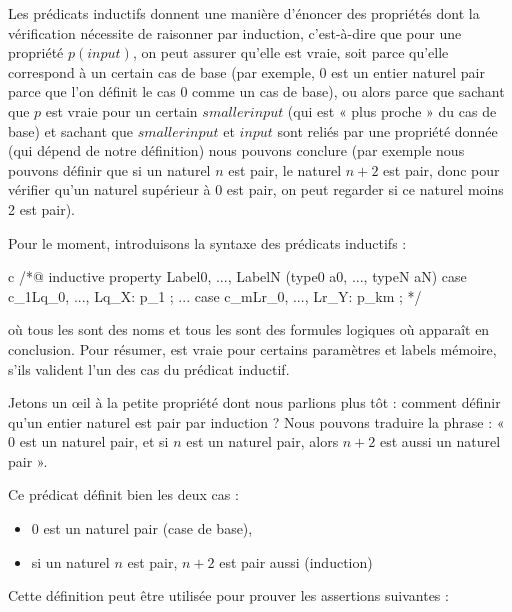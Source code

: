 Les prédicats inductifs donnent une manière d'énoncer des propriétés dont la
vérification nécessite de raisonner par induction, c'est-à-dire que pour une propriété
$p(input)$, on peut assurer qu'elle est vraie, soit parce qu'elle correspond à un
certain cas de base (par exemple, $0$ est un entier naturel pair parce que l'on
définit le cas 0 comme un cas de base), ou alors parce que sachant que $p$ est vraie
pour un certain $smaller input$ (qui est « plus proche » du cas de base) et sachant
que $smaller input$ et $input$ sont reliés par une propriété donnée (qui dépend
de notre définition) nous pouvons conclure (par exemple nous pouvons définir que
si un naturel $n$ est pair, le naturel $n+2$ est pair, donc pour vérifier qu'un
naturel supérieur à 0 est pair, on peut regarder si ce naturel moins 2 est pair).





Pour le moment, introduisons la syntaxe des prédicats inductifs :
\begin{CodeBlock}{c}
/*@
  inductive property{ Label0, ..., LabelN }(type0 a0, ..., typeN aN) {
  case c_1{Lq_0, ..., Lq_X}: p_1 ;
  ...
  case c_m{Lr_0, ..., Lr_Y}: p_km ;
  }
*/
\end{CodeBlock}
où tous les  sont des noms et tous les  sont
des formules logiques où  apparaît en conclusion. Pour résumer,
 est vraie pour certains paramètres et labels mémoire, s'ils
valident l'un des cas du prédicat inductif.


Jetons un \oe{}il à la petite propriété dont nous parlions plus tôt : comment définir
qu'un entier naturel est pair par induction ? Nous pouvons traduire la phrase :
« 0 est un naturel pair, et si $n$ est un naturel pair, alors $n+2$ est aussi un
naturel pair ».




Ce prédicat définit bien les deux cas :


\begin{itemize}
\item $0$ est un naturel pair (case de base),
\item si un naturel $n$ est pair, $n+2$ est pair aussi (induction)
\end{itemize}


Cette définition peut être utilisée pour prouver les assertions suivantes :




